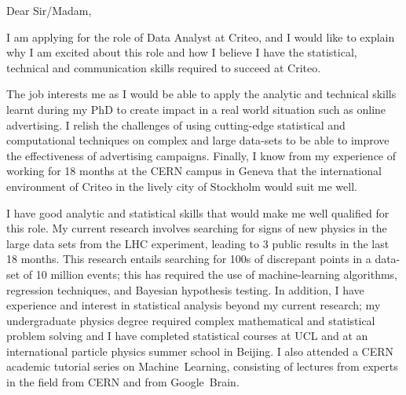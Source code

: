 \documentclass[]{letter}
\begin{document}

\begin{letter}{}  %
  \address{    Laurie McClymont,\\
    123 Tyers Street,\\
    London, \\
    SE11 5HS,\\
    UK\vspace{-1em}
  }
  \signature{\vspace{-1.2cm}Laurie McClymont}
  \opening{Dear Sir/Madam,}
  \vspace{1mm}

I am applying for the role of Data Analyst at Criteo, and I would like to explain why I am excited about this role and
how I believe I have the statistical, technical and communication skills required to succeed at Criteo.

The job interests me as I would be able to apply the analytic and technical skills learnt during my PhD
to create impact in a real world situation such as online advertising.
I relish the challenges of using cutting-edge statistical and computational techniques on complex and large data-sets to be able
to improve the effectiveness of advertising campaigns.
Finally, I know from my experience of working for 18 months at the CERN campus in Geneva
that the international environment of Criteo in the lively city of Stockholm would suit me well.

I have good analytic and statistical skills that would make me well qualified for this role.
My current research involves searching for signs of new physics in the large data sets from the LHC experiment,
leading to 3 public results in the last 18 months.
This research entails searching for 100s of discrepant points in a data-set of 10 million events;
this has required the use of machine-learning algorithms, regression techniques, and  Bayesian hypothesis testing.
In addition, I have experience and interest in statistical analysis beyond my current research;
my undergraduate physics degree required complex mathematical and statistical problem solving
and I have completed statistical courses at UCL and at an international particle physics summer school in Beijing.
I also attended a CERN academic tutorial series on Machine~Learning,
consisting of lectures from experts in the field from CERN and from Google~Brain.


\end{letter}
\end{document}
